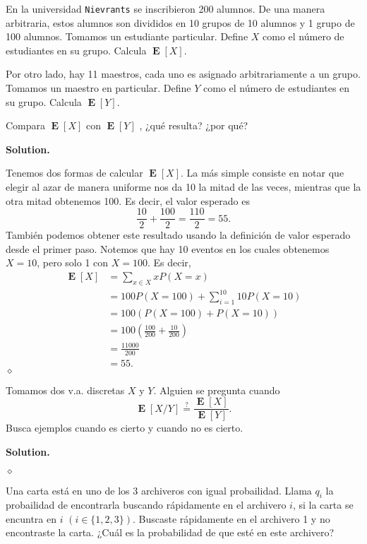 \documentclass{article}
\theoremstyle{problemstyle}
\newenvironment{solution}{%
  \begin{mdframed}[linewidth=0.8pt,linecolor=Gray,backgroundcolor=Gray!5,roundcorner=5pt, nobreak=true]%
  \noindent\textbf{Solution.}%
}{%
\hfill $ \diamond $ 
  \end{mdframed}%
}
\DeclareMathOperator{\E}{\mathbf{E}}
\begin{document}
\begin{problem}
En la universidad \texttt{Nievrants} se inscribieron 200 alumnos. De una manera
arbitraria, estos alumnos son divididos en 10 grupos de 10 alumnos y 1
grupo de 100 alumnos. Tomamos un estudiante particular. Define $ X $ como
el n\'umero de estudiantes en su grupo. Calcula $\E[X]$.

Por otro lado, hay 11 maestros, cada uno es asignado arbitrariamente a
un grupo. Tomamos un maestro en particular. Define $ Y $ como el n\'umero
de estudiantes en su grupo. Calcula $ \E[Y] $.

Compara $\E[X]$ con $\E[Y]$ , ¿qu\'e resulta? ¿por qu\'e?
\end{problem}
\begin{solution}
	Tenemos dos formas de calcular $ \E[X] $. La m\'as simple consiste en notar que elegir al azar de manera uniforme nos da 10 la mitad de las veces, mientras que la otra mitad obtenemos 100. Es decir, el valor esperado es
	\[
		\frac{10}{2} + \frac{100}{2} = \frac{110}{2} = 55.
	\]
	Tambi\'en podemos obtener este resultado usando la definici\'on de valor esperado desde el primer paso. Notemos que hay 10 eventos en los cuales obtenemos $ X = 10 $, pero solo 1 con $ X = 100 $. Es decir,
  \begin{align*}
    \E[X] &= \sum_{x\in X} x P(X=x) \\ 
          &= 100 P(X=100) + \sum_{i = 1}^{10} 10 P(X = 10)\\
          &= 100 (P(X=100) + P(X = 10))\\
          &= 100\left(\frac{100}{200} + \frac{10}{200}\right) \\
          &= \frac{11000}{200} \\
          &= 55.
  \end{align*}
\end{solution}

\begin{problem}
Tomamos dos v.a. discretas $ X $ y $ Y $. Alguien se pregunta cuando
\[
	\E[X/Y]\stackrel{?}{=}\frac{\E[X]}{\E[Y]}.
\]
Busca ejemplos cuando es cierto y cuando no es cierto.
\end{problem}
\begin{solution}

\end{solution}

\begin{problem}
Una carta est\'a en uno de los 3 archiveros con igual probailidad. Llama $ q_i $ la probailidad de encontrarla buscando r\'apidamente en el archivero $ i $, si la carta se encuntra en $ i $ $ (i \in \{1,2,3\}) $. Buscaste r\'apidamente en el archivero 1 y no encontraste la carta. ¿Cu\'al es la probabilidad de que est\'e en este archivero?

\end{problem}
\end{document}
